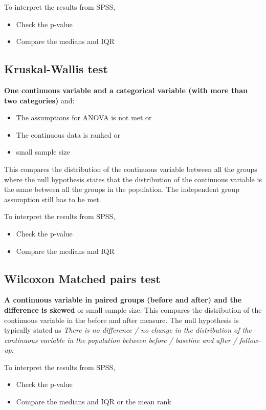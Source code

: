 \documentclass{article}
\begin{document}
To interpret the results from SPSS,
\begin{itemize}
    \item Check the p-value
    \item Compare the medians and IQR
\end{itemize}

\subsection{Kruskal-Wallis test}
\textbf{One continuous variable and a categorical variable (with more than two categories)} and:
\begin{itemize}
    \item The assumptions for ANOVA is not met or
    \item The continuous data is ranked or
    \item small sample size
\end{itemize}
This compares the distribution of the continuous variable between all the groups where the null hypothesis states that the distribution of the continuous variable is the same between all the groups in the population. The independent group assumption still has to be met.

To interpret the results from SPSS,
\begin{itemize}
    \item Check the p-value
    \item Compare the medians and IQR
\end{itemize}

\subsection{Wilcoxon Matched pairs test}
\textbf{A continuous variable in paired groups (before and after) and the difference is skewed} or small sample size. This compares the distribution of the continuous variable in the before and after measure. The null hypothesis is typically stated as \textit{There is no difference / no change in the distribution of the continuous variable in the population between before / baseline and after / follow-up}.

To interpret the results from SPSS,
\begin{itemize}
    \item Check the p-value
    \item Compare the medians and IQR or the mean rank
\end{itemize}
\end{document}
